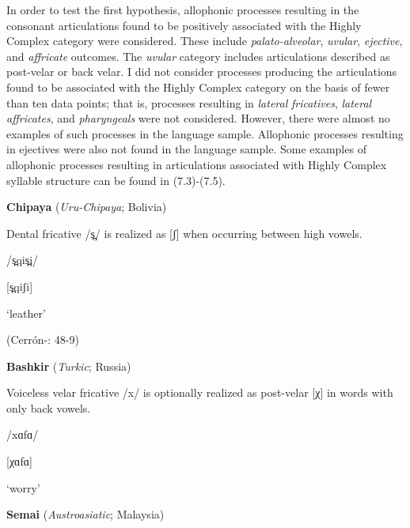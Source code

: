   In order to test the first hypothesis, allophonic processes resulting in the consonant articulations found to be positively associated with the Highly Complex category were considered. These include \textit{palato-alveolar}, \textit{uvular}, \textit{ejective}, and \textit{affricate} outcomes. The \textit{uvular} category includes articulations described as post-velar or back velar. I did not consider processes producing the articulations found to be associated with the Highly Complex category on the basis of fewer than ten data points; that is, processes resulting in \textit{lateral} \textit{fricatives}, \textit{lateral} \textit{affricates}, and \textit{pharyngeals} were not considered. However, there were almost no examples of such processes in the language sample. Allophonic processes resulting in ejectives were also not found in the language sample. Some examples of allophonic processes resulting in articulations associated with Highly Complex syllable structure can be found in (7.3)-(7.5).



\ea\label{ex:(7.3)}
  \textbf{Chipaya} (\textit{Uru-Chipaya}; Bolivia)



Dental fricative /s̪/ is realized as [ʃ] when occurring between high vowels.



/s̪qis̪i/



[s̪qiʃi]



‘leather’



(Cerrón-\citealt{Palomino2006}: 48-9)

\z


\ea\label{ex:(7.4)}
  \textbf{Bashkir} (\textit{Turkic}; Russia)



Voiceless velar fricative /x/ is optionally realized as post-velar [χ] in words with only back vowels.



/xɑfɑ/



[χɑfɑ]



‘worry’



\citep[11]{Poppe1964}

\z


\ea\label{ex:(7.5)}
  \textbf{Semai} (\textit{Austroasiatic}; Malaysia)



